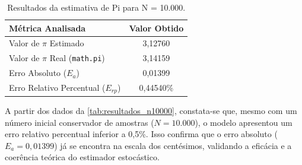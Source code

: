 \begin{table}[htb]
    \centering
    \ABNTEXfontereduzida
    \caption{\label{tab:resultados_n10000}Resultados da estimativa de Pi para N = 10.000.}
    \begin{tabular}{@{}lc@{}}
        \toprule
        \textbf{Métrica Analisada} & \textbf{Valor Obtido} \\ \midrule
        Valor de \texorpdfstring{$\pi$}{pi} Estimado & 3,12760 \\
        Valor de \texorpdfstring{$\pi$}{pi} Real (\texttt{math.pi}) & 3,14159 \\
        Erro Absoluto ($E_a$) & 0,01399 \\
        Erro Relativo Percentual ($E_{rp}$) & 0,44540\% \\ \bottomrule
    \end{tabular}
\end{table}

A partir dos dados da \autoref{tab:resultados_n10000}, constata-se que, mesmo com um número inicial conservador de amostras ($N = 10.000$), o modelo apresentou um erro relativo percentual inferior a 0,5\%. Isso confirma que o erro absoluto ($E_a = 0,01399$) já se encontra na escala dos centésimos, validando a eficácia e a coerência teórica do estimador estocástico.